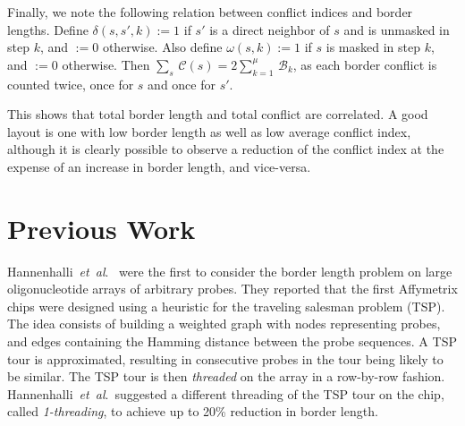 \documentclass[runningheads]{llncs}
\newcommand{\ignore}[1]{}
\begin{document}
Finally, we note the following relation between conflict indices and border
lengths. Define $\delta(s,s',k):=1$ if $s'$ is a direct neighbor of $s$ and is
unmasked in step $k$, and $:=0$ otherwise.  Also define $\omega(s,k):=1$ if
$s$ is masked in step $k$, and $:=0$ otherwise. Then $\sum_s\, \mathcal{C}(s)
= 2 \sum_{k=1}^\mu\, \mathcal{B}_k$, as each border conflict is counted twice,
once for $s$ and once for $s'$.

This shows that total border length and total conflict are correlated. A good
layout is one with low border length as well as low average conflict index,
although it is clearly possible to observe a reduction of the conflict index
at the expense of an increase in border length, and vice-versa.


\section{Previous Work}
\label{sec:previous_work}

\ignore{The first to formally address the border length problem were \cite{FELDMAN93}.
They showed how an optimal placement can be constructed based on a two-dimensional
Gray code. However, their work is restricted to \emph{uniform arrays} (arrays
containing all possible probes of a given length) and synchronous embeddings.}

Hannenhalli~{\it et~al}.\ \cite{HANNENHALLI02} were the first to consider the border
length problem on large
oligonucleotide arrays of arbitrary probes. They reported that the first Affymetrix
chips were designed using a heuristic for the traveling salesman problem (TSP). The
idea consists of building a weighted graph with nodes representing probes, and edges
containing the Hamming distance between the probe sequences. A TSP tour is approximated,
resulting in consecutive probes in the tour being likely to be similar. The TSP
tour is then \emph{threaded} on the array in a row-by-row fashion.
Hannenhalli~{\it et~al}.\ suggested a different threading of the TSP tour on the chip,
called \emph{1-threading}, to achieve up to 20\% reduction in border length.
\end{document}
